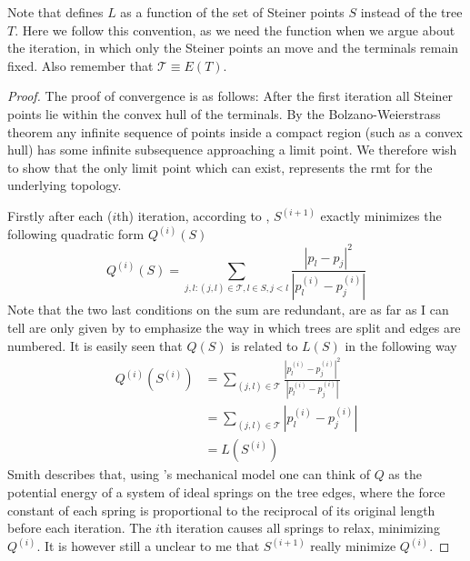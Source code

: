 Note that \textcite{smith1992} defines $L$ as a function of the set of
Steiner points $S$ instead of the tree $T$. Here we follow this
convention, as we need the function when we argue about the iteration, in which
only the Steiner points an move and the terminals remain fixed. Also remember
that $\mathcal{T} \equiv E(T)$.

\begin{proof}
The proof of convergence is as follows: After the first iteration all Steiner
points lie within the convex hull of the terminals. By the Bolzano-Weierstrass theorem any infinite  sequence of
points inside a compact region (such as a convex hull) has some infinite
subsequence approaching a limit point. We therefore wish to show that the only
limit point which can exist, represents the \ac{rmt} for the underlying topology.

Firstly after each ($i$th) iteration, according to \textcite{smith1992},
$S^{(i+1)}$ exactly minimizes the following quadratic form $Q^{(i)}(S)$
%
\begin{equation}
  Q^{(i)}(S) = \sum_{j,l : (j,l) \in \mathcal{T}, l \in S, j < l }
  \frac{|p_l - p_j|^2}{|p^{(i)}_l - p^{(i)}_j|}
\end{equation}
%
Note that the two last conditions on the sum are redundant, are as far as I can
tell are only given by \citeauthor{smith1992} to emphasize the way in which
trees are split and edges are numbered. It is easily seen that $Q(S)$ is related to
$L(S)$ in the following way
%
\begin{align}
  Q^{(i)}(S^{(i)})
  &= \sum_{(j,l) \in \mathcal{T}}
    \frac{|p^{(i)}_l - p^{(i)}_j|^2}{|p^{(i)}_l - p^{(i)}_j|} \\
  &= \sum_{(j,l) \in \mathcal{T}} |p^{(i)}_l - p^{(i)}_j| \\
  &= L(S^{(i)}) \label{eq:24}
\end{align}
%
Smith describes that, using \textcite{gilbert1968}'s mechanical model one can
think of $Q$ as the potential energy of a system of ideal springs on the tree
edges, where the force constant of each spring is proportional to the reciprocal
of its original length before each iteration. The $i$th iteration causes all
springs to relax, minimizing $Q^{(i)}$. It is however still a unclear to me that
$S^{(i+1)}$ really minimize $Q^{(i)}$.



\end{proof}
